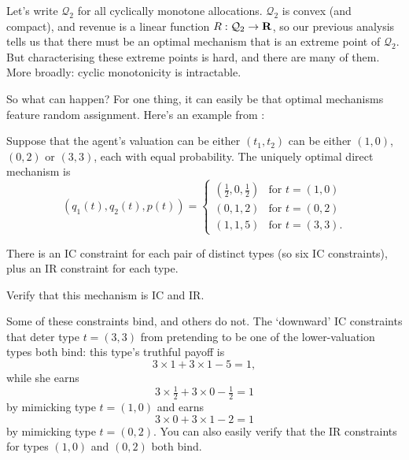 Let's write $\mathcal{Q}_2$ for all cyclically monotone allocations.
$\mathcal{Q}_2$ is convex (and compact),
and revenue is a linear function $R : \mathcal{Q}_2 \to \mathbf{R}$,
so our previous analysis tells us that there must be an optimal mechanism that is an extreme point of $\mathcal{Q}_2$.
But characterising these extreme points is hard, and there are many of them.
More broadly: cyclic monotonicity is intractable.

So what can happen? For one thing, it can easily be that optimal mechanisms feature random assignment.
Here's an example from \textcite{HartReny2015}:

\begin{proposition}
	\label{proposition:hartreny}
	Suppose that the agent's valuation can be either
	$(t_1,t_2)$ can be either $(1,0)$, $(0,2)$ or $(3,3)$, each with equal probability.
	The uniquely optimal direct mechanism is
	\begin{equation*}
		( q_1(t), q_2(t), p(t) )
		=
		\begin{cases}
			\left( \tfrac{1}{2}, 0, \tfrac{1}{2} \right)
			& \text{for $t=(1,0)$} \\
			( 0, 1, 2 )
			& \text{for $t=(0,2)$} \\
			( 1, 1, 5 )
			& \text{for $t=(3,3)$.} 
		\end{cases}
	\end{equation*}
\end{proposition}

There is an IC constraint for each pair of distinct types (so six IC constraints), plus an IR constraint for each type.

\begin{exercise}
	\label{exercise:hartreny_ic}
	Verify that this mechanism is IC and IR.
\end{exercise}

Some of these constraints bind, and others do not.
The `downward' IC constraints that deter type $t=(3,3)$ from pretending to be one of the lower-valuation types both bind:
this type's truthful payoff is
%
\begin{equation*}
	3 \times 1 + 3 \times 1 - 5
	= 1 ,
\end{equation*}
%
while she earns
%
\begin{equation*}
	3 \times \tfrac{1}{2} + 3 \times 0 - \tfrac{1}{2}
	= 1
\end{equation*}
%
by mimicking type $t=(1,0)$
and earns
%
\begin{equation*}
	3 \times 0 + 3 \times 1 - 2
	= 1
\end{equation*}
%
by mimicking type $t=(0,2)$.
You can also easily verify that the IR constraints for types $(1,0)$ and $(0,2)$ both bind.

